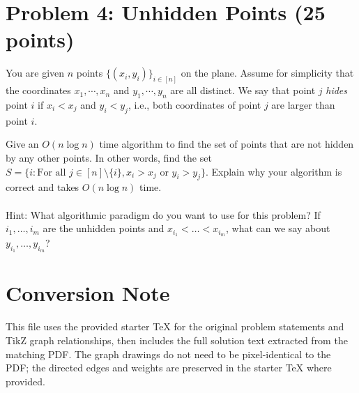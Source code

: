 \documentclass[12pt]{article}
\begin{document}
\vspace{5mm}
\section*{Problem 4: Unhidden Points (25 points)}

You are given $n$ points $\{(x_i, y_i)\}_{i \in [n]}$ on the plane. Assume for simplicity that the coordinates $x_1, \cdots, x_n$ and $y_1, \cdots, y_n$ are all distinct. 
We say that point $j$ {\em hides} point $i$ if $x_i < x_j$ and $y_i < y_j$, i.e., both coordinates of point $j$ are larger than point $i$.  

Give an $O(n \log n)$ time algorithm to find the set of points that are not hidden by any other points. In other words, find the set $S = \{i: \text{For all } j \in [n] \setminus \{i\}, x_i > x_j \text{ or } y_i > y_j\}$. Explain why your algorithm is correct and takes $O(n \log n)$ time.\\
\\
Hint: What algorithmic paradigm do you want to use for this problem? If $i_1,\ldots,i_m$ are the unhidden points and $x_{i_1} < \ldots < x_{i_m}$, what can we say about $y_{i_1},\ldots,y_{i_m}$?\\

\newpage
\section*{Conversion Note}
This file uses the provided starter TeX for the original problem statements and TikZ graph relationships, then includes the full solution text extracted from the matching PDF. The graph drawings do not need to be pixel-identical to the PDF; the directed edges and weights are preserved in the starter TeX where provided.

\newpage
\end{document}
